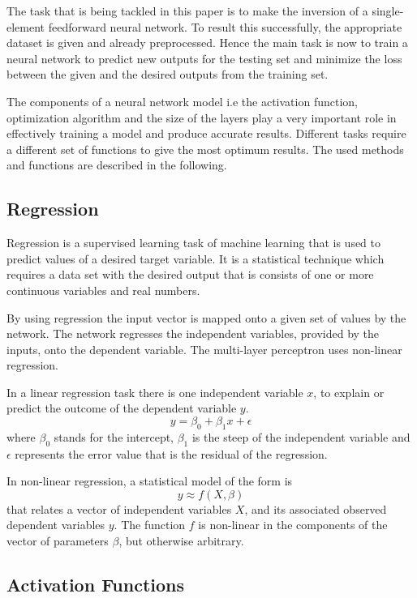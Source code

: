 The task that is being tackled in this paper is to make the inversion of a single-element feedforward neural network. To result this successfully, the appropriate dataset is given and already preprocessed. Hence the main task is now to train a neural network to predict new outputs for the testing set and minimize the loss between the given and the desired outputs from the training set. \medskip

The components of a neural network model i.e the activation function, optimization algorithm and the size of the layers play a very important role in effectively training a model and produce accurate results. Different tasks require a different set of functions to give the most optimum results. The used methods and functions are described in the following.


\subsection{Regression}

Regression is a supervised learning task of machine learning that is used to predict values of a desired target variable. It is a statistical technique which requires a data set with the desired output that is consists of one or more continuous variables and real numbers.\smallskip

By using regression the input vector is mapped onto a given set of values by the network. The network regresses the independent variables, provided by the inputs, onto the dependent variable. The multi-layer perceptron uses non-linear regression.  \medskip

In a linear regression task there is one independent variable $x$, to explain or predict the outcome of the dependent variable $y$.
$$ y = \beta_0 + \beta_1x + \epsilon $$
where $\beta_0$ stands for the intercept, $\beta_1$ is the steep of the independent variable and $\epsilon$ represents the error value that is the residual of the regression. \medskip

In non-linear regression, a statistical model of the form is
$$ y \approx f(X,\beta) $$
that relates a vector of independent variables $X$, and its associated observed dependent variables $y$. The function $f$ is non-linear in the components of the vector of parameters $\beta$, but otherwise arbitrary. 



\subsection{Activation Functions}


